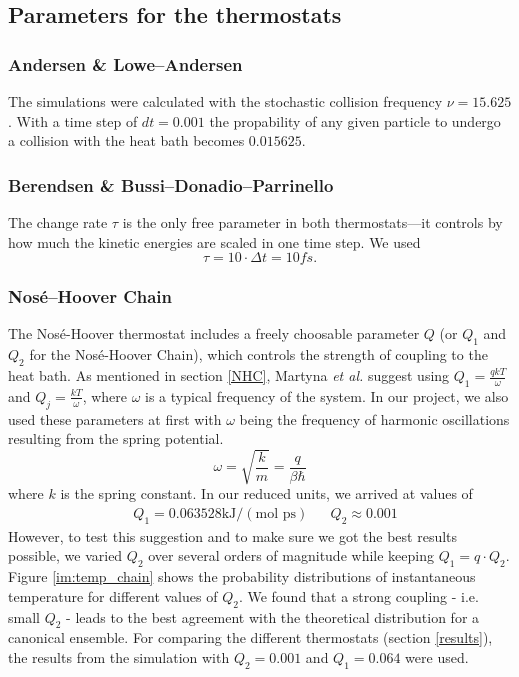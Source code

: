 \subsection{Parameters for the thermostats}
\subsubsection{Andersen \& Lowe--Andersen}
The simulations were calculated with the stochastic collision frequency $\nu = 15.625$. With a time step of $dt=0.001$ the propability of any given particle to undergo a collision with the heat bath becomes $0.015625$.

\subsubsection{Berendsen \& Bussi--Donadio--Parrinello}
The change rate $\tau$ is the only free parameter in both thermostats---it controls by how much the kinetic energies are scaled in one time step. We used 
\begin{equation}
\tau = 10\cdot \Delta t = 10fs\text{.}
\end{equation}

\subsubsection{Nosé--Hoover Chain}
The Nosé-Hoover thermostat includes a freely choosable parameter $Q$ (or $Q_1$ and $Q_2$ for the Nosé-Hoover Chain), which controls the strength of coupling to the heat bath. As mentioned in section \ref{NHC}, Martyna \textit{et al.} \cite{Martyna1992} suggest using $Q_1 = \frac{qkT}{\omega}$ and $Q_j = \frac{kT}{\omega}$, where $\omega$ is a typical frequency of the system. In our project, we also used these parameters at first with $\omega$ being the frequency of harmonic oscillations resulting from the spring potential.
\begin{equation}
\omega = \sqrt{\frac{k}{m}} = \frac{q}{\beta \hbar}
\end{equation} 
where $k$ is the spring constant. In our reduced units, we arrived at values of 
\begin{align*}
& Q_1 = 0.063528 \text{kJ}/(\text{mol ps}) && Q_2 \approx 0.001
\end{align*} 
However, to test this suggestion and to make sure we got the best results possible, we varied $Q_2$ over several orders of magnitude while keeping $Q_1 = q\cdot Q_2$. Figure \ref{im:temp_chain} shows the probability distributions of instantaneous temperature for different values of $Q_2$. We found that a strong coupling - i.e. small $Q_2$ - leads to the best agreement with the theoretical distribution for a canonical ensemble. For comparing the different thermostats (section \ref{results}), the results from the simulation with $Q_2 = 0.001$ and $Q_1 = 0.064$ were used. 

